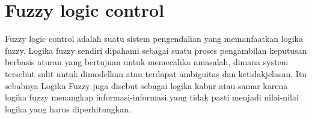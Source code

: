 \section{Fuzzy logic control}
Fuzzy logic control adalah suatu sistem pengendalian yang memanfaatkan logika fuzzy. Logika fuzzy sendiri dipahami sebagai suatu proses pengambilan keputusan berbasis aturan yang bertujuan untuk memecahka nmasalah, dimana system tersebut sulit untuk dimodelkan atau terdapat ambiguitas dan ketidakjelasan. Itu sebabnya Logika Fuzzy juga disebut sebagai logika kabur atau samar karena logika fuzzy menangkap informasi-informasi yang tidak pasti menjadi nilai-nilai logika yang harus diperhitungkan.
